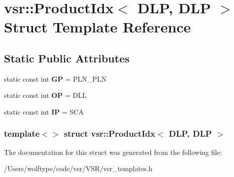 \hypertarget{structvsr_1_1_product_idx_3_01_d_l_p_00_01_d_l_p_01_4}{\section{vsr\-:\-:Product\-Idx$<$ D\-L\-P, D\-L\-P $>$ Struct Template Reference}
\label{structvsr_1_1_product_idx_3_01_d_l_p_00_01_d_l_p_01_4}
}
\subsection*{Static Public Attributes}
\begin{DoxyCompactItemize}
\item 
\hypertarget{structvsr_1_1_product_idx_3_01_d_l_p_00_01_d_l_p_01_4_a671ac3a230c3d05d6fa8a3bf952f012e}{static const int {\bfseries G\-P} = P\-L\-N\-\_\-\-P\-L\-N}\label{structvsr_1_1_product_idx_3_01_d_l_p_00_01_d_l_p_01_4_a671ac3a230c3d05d6fa8a3bf952f012e}

\item 
\hypertarget{structvsr_1_1_product_idx_3_01_d_l_p_00_01_d_l_p_01_4_a9a61ac28d066dde10d86fdd5b697f3d2}{static const int {\bfseries O\-P} = D\-L\-L}\label{structvsr_1_1_product_idx_3_01_d_l_p_00_01_d_l_p_01_4_a9a61ac28d066dde10d86fdd5b697f3d2}

\item 
\hypertarget{structvsr_1_1_product_idx_3_01_d_l_p_00_01_d_l_p_01_4_a7e5e3b575ab7ba0d21e070fe39a8f9c8}{static const int {\bfseries I\-P} = S\-C\-A}\label{structvsr_1_1_product_idx_3_01_d_l_p_00_01_d_l_p_01_4_a7e5e3b575ab7ba0d21e070fe39a8f9c8}

\end{DoxyCompactItemize}
\subsubsection*{template$<$$>$ struct vsr\-::\-Product\-Idx$<$ D\-L\-P, D\-L\-P $>$}



The documentation for this struct was generated from the following file\-:\begin{DoxyCompactItemize}
\item 
/\-Users/wolftype/code/vsr/\-V\-S\-R/vsr\-\_\-templates.\-h\end{DoxyCompactItemize}
